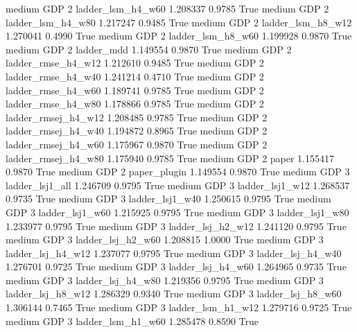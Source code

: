     medium      GDP                 2   ladder_lsm_h4_w60   1.208337      0.9785    True
    medium      GDP                 2   ladder_lsm_h4_w80   1.217247      0.9485    True
    medium      GDP                 2   ladder_lsm_h8_w12   1.270041      0.4990    True
    medium      GDP                 2   ladder_lsm_h8_w60   1.199928      0.9870    True
    medium      GDP                 2          ladder_mdd   1.149554      0.9870    True
    medium      GDP                 2  ladder_rmse_h4_w12   1.212610      0.9485    True
    medium      GDP                 2  ladder_rmse_h4_w40   1.241214      0.4710    True
    medium      GDP                 2  ladder_rmse_h4_w60   1.189741      0.9785    True
    medium      GDP                 2  ladder_rmse_h4_w80   1.178866      0.9785    True
    medium      GDP                 2 ladder_rmsej_h4_w12   1.208485      0.9785    True
    medium      GDP                 2 ladder_rmsej_h4_w40   1.194872      0.8965    True
    medium      GDP                 2 ladder_rmsej_h4_w60   1.175967      0.9870    True
    medium      GDP                 2 ladder_rmsej_h4_w80   1.175940      0.9785    True
    medium      GDP                 2               paper   1.155417      0.9870    True
    medium      GDP                 2        paper_plugin   1.149554      0.9870    True
    medium      GDP                 3     ladder_lsj1_all   1.246709      0.9795    True
    medium      GDP                 3     ladder_lsj1_w12   1.268537      0.9735    True
    medium      GDP                 3     ladder_lsj1_w40   1.250615      0.9795    True
    medium      GDP                 3     ladder_lsj1_w60   1.215925      0.9795    True
    medium      GDP                 3     ladder_lsj1_w80   1.233977      0.9795    True
    medium      GDP                 3   ladder_lsj_h2_w12   1.241120      0.9795    True
    medium      GDP                 3   ladder_lsj_h2_w60   1.208815      1.0000    True
    medium      GDP                 3   ladder_lsj_h4_w12   1.237077      0.9795    True
    medium      GDP                 3   ladder_lsj_h4_w40   1.276701      0.9725    True
    medium      GDP                 3   ladder_lsj_h4_w60   1.264965      0.9735    True
    medium      GDP                 3   ladder_lsj_h4_w80   1.219356      0.9795    True
    medium      GDP                 3   ladder_lsj_h8_w12   1.286329      0.9340    True
    medium      GDP                 3   ladder_lsj_h8_w60   1.306144      0.7465    True
    medium      GDP                 3   ladder_lsm_h1_w12   1.279716      0.9725    True
    medium      GDP                 3   ladder_lsm_h1_w60   1.285478      0.8590    True
